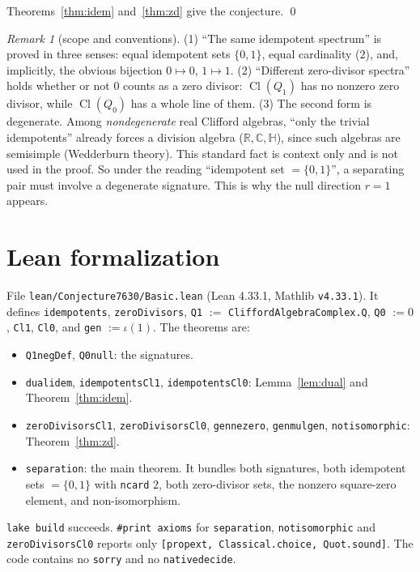 \documentclass[11pt]{article}
\theoremstyle{definition}
\theoremstyle{remark}
\newtheorem{remark}[theorem]{Remark}
\renewcommand{\_}{\oldus\allowbreak}
\newcommand{\Cl}{\operatorname{Cl}}
\begin{document}
Theorems~\ref{thm:idem} and~\ref{thm:zd} give the conjecture. \qed

\begin{remark}[scope and conventions]
(1) ``The same idempotent spectrum'' is proved in three senses: equal idempotent sets $\{0,1\}$,
equal cardinality ($2$), and, implicitly, the obvious bijection $0\mapsto0$, $1\mapsto1$. (2)
``Different zero-divisor spectra'' holds whether or not $0$ counts as a zero divisor: $\Cl(Q_1)$
has no nonzero zero divisor, while $\Cl(Q_0)$ has a whole line of them. (3) The second form is
degenerate. Among \emph{nondegenerate} real Clifford algebras, ``only the trivial idempotents''
already forces a division algebra ($\mathbb{R},\mathbb{C},\mathbb{H}$), since such algebras are
semisimple (Wedderburn theory). This standard fact is context only and is not used in the proof. So
under the reading ``idempotent set $=\{0,1\}$'', a separating pair must involve a degenerate
signature. This is why the null direction $r=1$ appears.
\end{remark}

\section{Lean formalization}

File \texttt{lean/Conjecture7630/Basic.lean} (Lean 4.33.1, Mathlib \texttt{v4.33.1}). It defines
\texttt{idempotents}, \texttt{zeroDivisors}, \texttt{Q1} $:=$ \texttt{CliffordAlgebraComplex.Q},
\texttt{Q0} $:= 0$, \texttt{Cl1}, \texttt{Cl0}, and \texttt{gen} $:=\iota(1)$. The theorems are:
\begin{itemize}
\item \texttt{Q1\_negDef}, \texttt{Q0\_null}: the signatures.
\item \texttt{dual\_idem}, \texttt{idempotents\_Cl1}, \texttt{idempotents\_Cl0}: Lemma~\ref{lem:dual}
and Theorem~\ref{thm:idem}.
\item \texttt{zeroDivisors\_Cl1}, \texttt{zeroDivisors\_Cl0}, \texttt{gen\_ne\_zero},
\texttt{gen\_mul\_gen}, \texttt{not\_isomorphic}: Theorem~\ref{thm:zd}.
\item \texttt{separation}: the main theorem. It bundles both signatures, both idempotent sets
$=\{0,1\}$ with \texttt{ncard} $2$, both zero-divisor sets, the nonzero square-zero element, and
non-isomorphism.
\end{itemize}
\texttt{lake build} succeeds. \texttt{\#print axioms} for \texttt{separation},
\texttt{not\_isomorphic} and \texttt{zeroDivisors\_Cl0} reports only
\texttt{[propext, Classical.choice, Quot.sound]}. The code contains no \texttt{sorry} and no
\texttt{native\_decide}.
\end{document}
